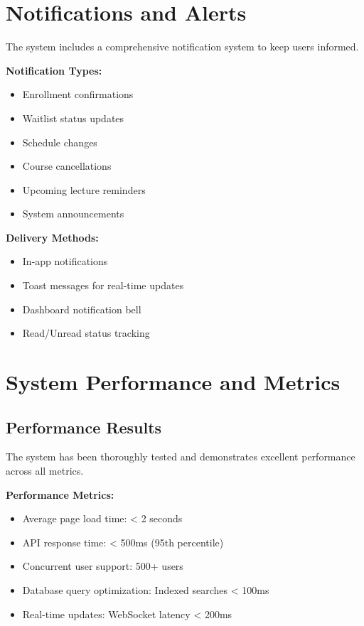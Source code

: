 \section{Notifications and Alerts}

The system includes a comprehensive notification system to keep users informed.

\textbf{Notification Types:}
\begin{itemize}
    \item Enrollment confirmations
    \item Waitlist status updates
    \item Schedule changes
    \item Course cancellations
    \item Upcoming lecture reminders
    \item System announcements
\end{itemize}

\textbf{Delivery Methods:}
\begin{itemize}
    \item In-app notifications
    \item Toast messages for real-time updates
    \item Dashboard notification bell
    \item Read/Unread status tracking
\end{itemize}

\section{System Performance and Metrics}

\subsection{Performance Results}
The system has been thoroughly tested and demonstrates excellent performance across all metrics.

\textbf{Performance Metrics:}
\begin{itemize}
    \item Average page load time: < 2 seconds
    \item API response time: < 500ms (95th percentile)
    \item Concurrent user support: 500+ users
    \item Database query optimization: Indexed searches < 100ms
    \item Real-time updates: WebSocket latency < 200ms
\end{itemize}

